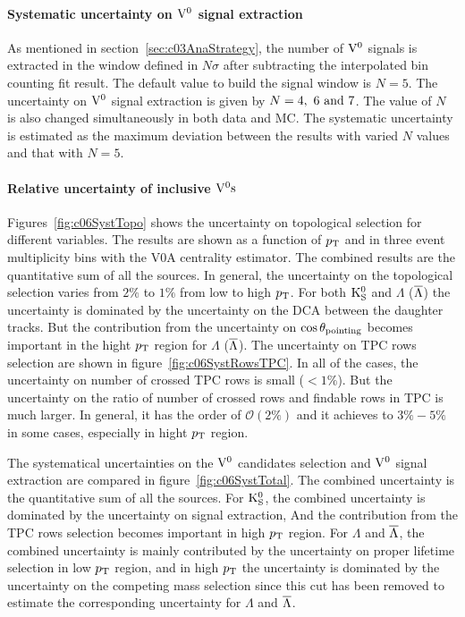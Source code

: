 \paragraph{Systematic uncertainty on ${\rm V}^{0}$ signal extraction}
As mentioned in section~\ref{sec:c03AnaStrategy},
the number of ${\rm V}^{0}$ signals is extracted in the window defined
in $N\sigma$ after subtracting the interpolated bin counting fit result.
The default value to build the signal window is $N=5$.
The uncertainty on ${\rm V}^{0}$ signal extraction is given by $N=4,~6~{\rm and}~7$.
The value of $N$ is also changed simultaneously in both data and MC.
The systematic uncertainty is estimated as the maximum deviation between
the results with varied $N$ values and that with $N=5$.

\paragraph{Relative uncertainty of inclusive ${\rm V}^{0}{\rm s}$}
Figures~\ref{fig:c06SystTopo} shows the uncertainty on topological selection
for different variables.
The results are shown as a function of $p_{\rm T}$ and in three event multiplicity
bins with the V0A centrality estimator.
The combined results are the quantitative sum of all the sources.
In general, the uncertainty on the topological selection varies
from $2\%$ to $1\%$ from low to high $p_{\rm T}$.
For both ${\rm K}_{\rm S}^{0}$ and $\Lambda$ ($\overline{\Lambda}$) the uncertainty is dominated
by the uncertainty on the DCA between the daughter tracks.
But the contribution from the uncertainty on $\cos\theta_{\rm pointing}$
becomes important in the hight $p_{\rm T}$ region for $\Lambda$ ($\overline{\Lambda}$).
The uncertainty on TPC rows selection are shown
in figure~\ref{fig:c06SystRowsTPC}.
In all of the cases, the uncertainty on number of crossed TPC rows is
small ($<1\%$).
But the uncertainty on the ratio of number of crossed rows and findable
rows in TPC is much larger.
In general, it has the order of $\mathcal{O}(2\%)$ and
it achieves to $3\%-5\%$ in some cases,
especially in hight $p_{\rm T}$ region.
 
 The systematical uncertainties on the ${\rm V}^{0}$ candidates selection
and ${\rm V}^{0}$ signal extraction are compared in figure~\ref{fig:c06SystTotal}.
The combined uncertainty is the quantitative sum of all the sources.
For ${\rm K}_{\rm S}^{0}$, the combined uncertainty is dominated by the uncertainty on
signal extraction,
And the contribution from the TPC rows selection becomes important
in high $p_{\rm T}$ region.
For $\Lambda$ and $\overline{\Lambda}$, the combined uncertainty is mainly contributed
by the uncertainty on proper lifetime selection in low $p_{\rm T}$ region,
and in high $p_{\rm T}$ the uncertainty is dominated by the uncertainty on the
competing mass selection since this cut has been removed to estimate the
corresponding uncertainty for $\Lambda$ and $\overline{\Lambda}$.


